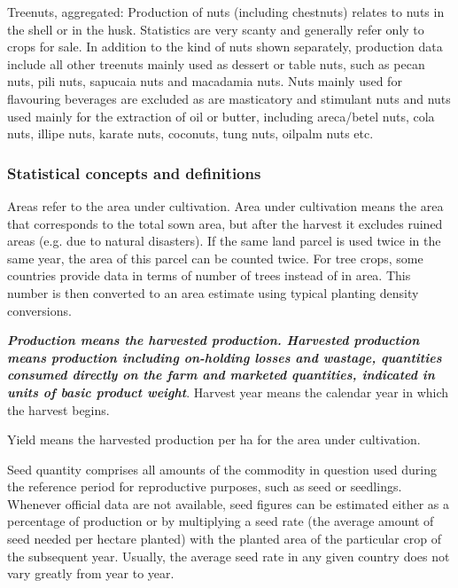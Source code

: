 \documentclass[11pt]{article}
\begin{document}
Treenuts, aggregated: Production of nuts (including chestnuts) relates
to nuts in the shell or in the husk. Statistics are very scanty and
generally refer only to crops for sale. In addition to the kind of nuts
shown separately, production data include all other treenuts mainly used
as dessert or table nuts, such as pecan nuts, pili nuts, sapucaia nuts
and macadamia nuts. Nuts mainly used for flavouring beverages are
excluded as are masticatory and stimulant nuts and nuts used mainly for
the extraction of oil or butter, including areca/betel nuts, cola nuts,
illipe nuts, karate nuts, coconuts, tung nuts, oilpalm nuts etc.

\subsubsection{Statistical concepts and
definitions}\label{statistical-concepts-and-definitions}

Areas refer to the area under cultivation. Area under cultivation means
the area that corresponds to the total sown area, but after the harvest
it excludes ruined areas (e.g. due to natural disasters). If the same
land parcel is used twice in the same year, the area of this parcel can
be counted twice. For tree crops, some countries provide data in terms
of number of trees instead of in area. This number is then converted to
an area estimate using typical planting density conversions.

\textbf{\emph{Production means the harvested production. Harvested
production means production including on-holding losses and wastage,
quantities consumed directly on the farm and marketed quantities,
indicated in units of basic product weight}}. Harvest year means the
calendar year in which the harvest begins.

Yield means the harvested production per ha for the area under
cultivation.

Seed quantity comprises all amounts of the commodity in question used
during the reference period for reproductive purposes, such as seed or
seedlings. Whenever official data are not available, seed figures can be
estimated either as a percentage of production or by multiplying a seed
rate (the average amount of seed needed per hectare planted) with the
planted area of the particular crop of the subsequent year. Usually, the
average seed rate in any given country does not vary greatly from year
to year.
\end{document}
